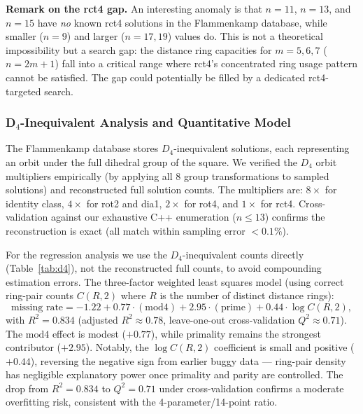 \documentclass[11pt,a4paper]{article}
\theoremstyle{plain}
\theoremstyle{definition}
\begin{document}
\noindent\textbf{Remark on the rct4 gap.} An interesting anomaly is that $n=11$, $n=13$, and $n=15$ have \emph{no} known rct4 solutions in the Flammenkamp database, while smaller ($n=9$) and larger ($n=17,19$) values do. This is not a theoretical impossibility but a search gap: the distance ring capacities for $m=5,6,7$ ($n=2m+1$) fall into a critical range where rct4's concentrated ring usage pattern cannot be satisfied. The gap could potentially be filled by a dedicated rct4-targeted search.

\subsubsection{D$_4$-Inequivalent Analysis and Quantitative Model}
\label{sec:regression}

The Flammenkamp database stores $D_4$-inequivalent solutions, each representing an orbit under the full dihedral group of the square. We verified the $D_4$ orbit multipliers empirically (by applying all 8 group transformations to sampled solutions) and reconstructed full solution counts. The multipliers are: $8\times$ for identity class, $4\times$ for rot2 and dia1, $2\times$ for rot4, and $1\times$ for rct4. Cross-validation against our exhaustive C++ enumeration ($n\le13$) confirms the reconstruction is exact (all match within sampling error $<0.1\%$).

For the regression analysis we use the $D_4$-inequivalent counts directly (Table~\ref{tab:d4}), not the reconstructed full counts, to avoid compounding estimation errors. The three-factor weighted least squares model (using correct ring-pair counts $C(R,2)$ where $R$ is the number of distinct distance rings):
\[
\text{missing rate} = -1.22 + 0.77\cdot(\text{mod4}) + 2.95\cdot(\text{prime}) + 0.44\cdot\log C(R,2),
\]
with $R^2 = 0.834$ (adjusted $R^2 \approx 0.78$, leave-one-out cross-validation $Q^2 \approx 0.71$). The $\text{mod4}$ effect is modest ($+0.77$), while primality remains the strongest contributor ($+2.95$). Notably, the $\log C(R,2)$ coefficient is small and positive ($+0.44$), reversing the negative sign from earlier buggy data --- ring-pair density has negligible explanatory power once primality and parity are controlled. The drop from $R^2=0.834$ to $Q^2=0.71$ under cross-validation confirms a moderate overfitting risk, consistent with the 4-parameter/14-point ratio.
\end{document}
